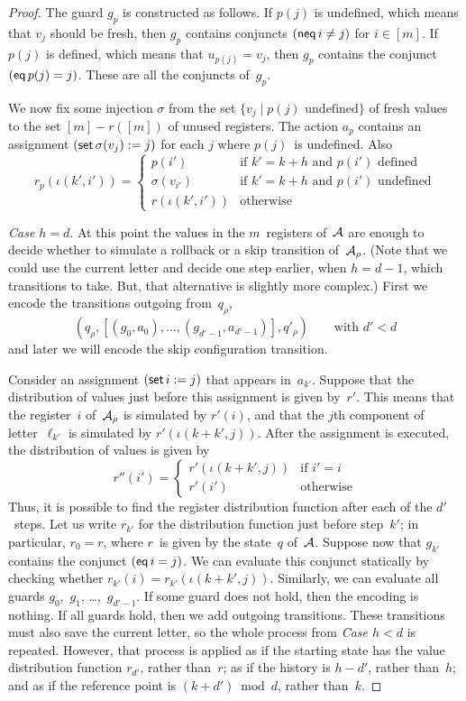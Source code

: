 \documentclass[9pt, preprint]{sigplanconf} %
\theoremstyle{definition}
\theoremstyle{remark}
\begin{document}
\begin{proof}
The guard $g_p$ is constructed as follows.
If $p(j)$ is undefined, which means that $v_j$ should be fresh, then $g_p$ contains conjuncts $({\sf neq}\,i\ne j)$ for $i\in[m]$.
If $p(j)$ is defined, which means that $u_{p(j)}=v_j$, then $g_p$ contains the conjunct $({\sf eq}\,p(j)=j)$.
These are all the conjuncts of~$g_p$.

We now fix some injection $\sigma$ from the set $\{v_j\mid\text{$p(j)$ undefined}\}$ of fresh values to the set $[m]-r([m])$ of unused registers.
The action $a_p$ contains an assignment $({\sf set}\,\sigma(v_j):=j)$ for each $j$ where $p(j)$~is undefined.
Also
\[ r_p(\iota(k',i')) = \begin{cases}
  p(i')  & \text{if $k'=k+h$ and $p(i')$ defined} \\
  \sigma(v_{i'}) & \text{if $k'=k+h$ and $p(i')$ undefined} \\
  r(\iota(k',i')) &\text{otherwise}
\end{cases}\]


{\it Case $h=d$}.
At this point the values in the $m$~registers of~${\cal A}$ are enough to decide whether to simulate a rollback or a skip transition of~${\cal A}_\rho$.
(Note that we could use the current letter and decide one step earlier, when $h=d-1$, which transitions to take.
But, that alternative is slightly more complex.)
First we encode the transitions outgoing from~$q_\rho$,
\[ (q_\rho, [(g_0,a_0),\ldots,(g_{d'-1},a_{d'-1})], q'_\rho)
  \qquad\text{with $d'<d$} \]
and later we will encode the skip configuration transition.

Consider an assignment $({\sf set}\,i:=j)$ that appears in~$a_{k'}$.
Suppose that the distribution of values just before this assignment is given by~$r'$.
This means that the register~$i$ of~${\cal A}_\rho$ is simulated by $r'(i)$, and that the $j$th component of letter~$\ell_{k'}$ is simulated by $r'(\iota(k+k',j))$.
After the assignment is executed, the distribution of values is given by
\[r''(i') = \begin{cases}
  r'(\iota(k+k',j)) & \text{if $i'=i$} \\
  r'(i') & \text{otherwise}
\end{cases}\]
Thus, it is possible to find the register distribution function after each of the $d'$~steps.
Let us write $r_{k'}$ for the distribution function just before step~$k'$; in particular, $r_0=r$, where $r$~is given by the state~$q$ of~${\cal A}$.
Suppose now that $g_{k'}$ contains the conjunct $({\sf eq}\,i=j)$.
We can evaluate this conjunct statically by checking whether $r_{k'}(i)=r_{k'}(\iota(k+k',j))$.
Similarly, we can evaluate all guards $g_0$,~$g_1$, \dots,~$g_{d'-1}$.
If some guard does not hold, then the encoding is nothing.
If all guards hold, then we add outgoing transitions.
These transitions must also save the current letter, so the whole process from {\it Case $h<d$} is repeated.
However, that process is applied as if the starting state has the value distribution function $r_{d'}$, rather than~$r$; as if the history is $h-d'$, rather than~$h$; and as if the reference point is $(k+d')\bmod d$, rather than~$k$.


\end{proof}
\end{document}
